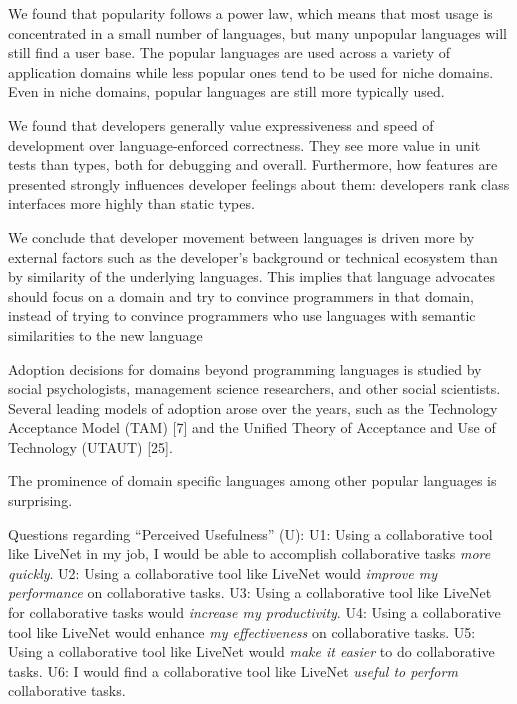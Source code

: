 We found that popularity follows a power law, which
means that most usage is concentrated in a small number
of languages, but many unpopular languages will still find
a user base. The popular languages are used across a variety
of application domains while less popular ones tend to
be used for niche domains. Even in niche domains, popular
languages are still more typically used.

We found that developers generally value expressiveness
and speed of development over language-enforced correctness.
They see more value in unit tests than types, both for
debugging and overall. Furthermore, how features are presented
strongly influences developer feelings about them:
developers rank class interfaces more highly than static
types.

We conclude that developer movement
between languages is driven more by external factors such
as the developer’s background or technical ecosystem than
by similarity of the underlying languages. This implies that
language advocates should focus on a domain and try to
convince programmers in that domain, instead of trying to
convince programmers who use languages with semantic
similarities to the new language

Adoption decisions for domains beyond programming
languages is studied by social psychologists, management
science researchers, and other social scientists. Several
leading models of adoption arose over the years, such
as the Technology Acceptance Model (TAM) [7] and the
Unified Theory of Acceptance and Use of Technology
(UTAUT) [25].

The prominence of domain specific languages
among other popular languages is surprising.


\cite{meyerovich2013empirical}





Questions regarding “Perceived Usefulness” (U):
U1: Using a collaborative tool like LiveNet in my job, I would
be able to accomplish collaborative tasks \emph{more quickly}.
U2: Using a collaborative tool like LiveNet would \emph{improve my
performance} on collaborative tasks.
U3: Using a collaborative tool like LiveNet for collaborative
tasks would \emph{increase my productivity}.
U4: Using a collaborative tool like LiveNet would enhance \emph{my
effectiveness} on collaborative tasks.
U5: Using a collaborative tool like LiveNet would \emph{make it
easier} to do collaborative tasks.
U6: I would find a collaborative tool like LiveNet \emph{useful to
perform} collaborative tasks.

